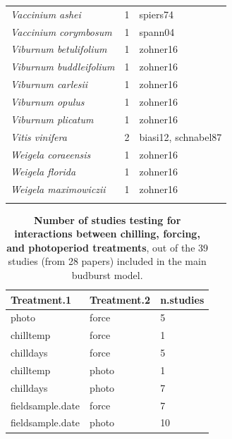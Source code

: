 \documentclass{article}
\begin{document}
\begin{footnotesize}
\begin{longtable}{p{}p{}p{}}
  \textit{Vaccinium ashei} &   1 & spiers74 \\ 
  \textit{Vaccinium corymbosum} &   1 & spann04 \\ 
  \textit{Viburnum betulifolium} &   1 & zohner16 \\ 
  \textit{Viburnum buddleifolium} &   1 & zohner16 \\ 
  \textit{Viburnum carlesii} &   1 & zohner16 \\ 
  \textit{Viburnum opulus} &   1 & zohner16 \\ 
  \textit{Viburnum plicatum} &   1 & zohner16 \\ 
  \textit{Vitis vinifera} &   2 & biasi12, schnabel87 \\ 
  \textit{Weigela coraeensis} &   1 & zohner16 \\ 
  \textit{Weigela florida} &   1 & zohner16 \\ 
  \textit{Weigela maximowiczii} &   1 & zohner16 \\ 
   \hline
\hline
\label{tab:sp}
\end{longtable}
\pagebreak

\begin{table}[ht]
\centering
\caption{\textbf{Number of studies testing for interactions between chilling, forcing, and photoperiod treatments}, out of the 39 studies (from 28 papers) included in the main budburst model.} 
\label{tab:intxn}
\begingroup\footnotesize
\begin{tabular}{|p{}|p{}|p{}|}
  \hline
Treatment.1 & Treatment.2 & n.studies \\ 
  \hline
photo & force &   5 \\ 
  chilltemp & force &   1 \\ 
  chilldays & force &   5 \\ 
  chilltemp & photo &   1 \\ 
  chilldays & photo &   7 \\ 
  fieldsample.date & force &   7 \\ 
  fieldsample.date & photo &  10 \\ 
   \hline
\end{tabular}
\endgroup
\end{table}
\pagebreak


\end{footnotesize}
\end{document}
